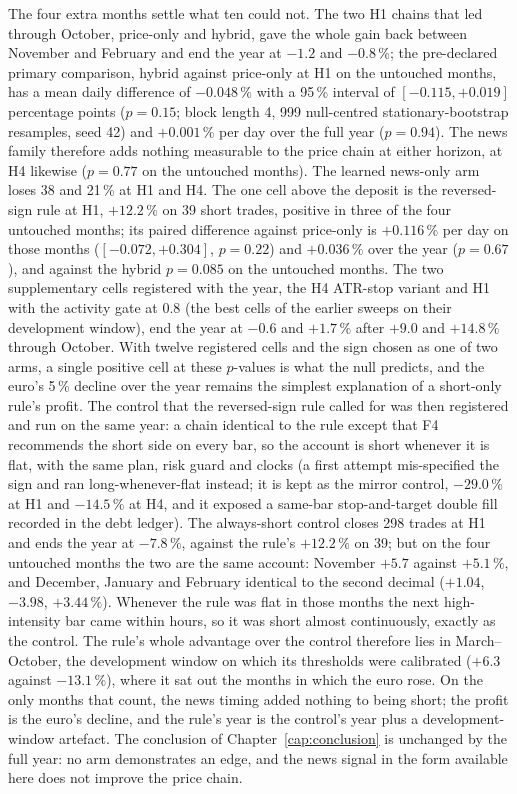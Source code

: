 The four extra months settle what ten could not. The two H1 chains that led through October, price-only and hybrid, gave the whole gain back between November and February and end the year at $-1.2$ and $-0.8\,\%$; the pre-declared primary comparison, hybrid against price-only at H1 on the untouched months, has a mean daily difference of $-0.048\,\%$ with a 95\,\% interval of $[-0.115, +0.019]$ percentage points ($p = 0.15$; block length 4, 999 null-centred stationary-bootstrap resamples, seed 42) and $+0.001\,\%$ per day over the full year ($p = 0.94$). The news family therefore adds nothing measurable to the price chain at either horizon, at H4 likewise ($p = 0.77$ on the untouched months). The learned news-only arm loses 38 and 21\,\% at H1 and H4. The one cell above the deposit is the reversed-sign rule at H1, $+12.2\,\%$ on 39 short trades, positive in three of the four untouched months; its paired difference against price-only is $+0.116\,\%$ per day on those months ($[-0.072, +0.304]$, $p = 0.22$) and $+0.036\,\%$ over the year ($p = 0.67$), and against the hybrid $p = 0.085$ on the untouched months. The two supplementary cells registered with the year, the H4 ATR-stop variant and H1 with the activity gate at 0.8 (the best cells of the earlier sweeps on their development window), end the year at $-0.6$ and $+1.7\,\%$ after $+9.0$ and $+14.8\,\%$ through October. With twelve registered cells and the sign chosen as one of two arms, a single positive cell at these $p$-values is what the null predicts, and the euro's 5\,\% decline over the year remains the simplest explanation of a short-only rule's profit. The control that the reversed-sign rule called for was then registered and run on the same year: a chain identical to the rule except that F4 recommends the short side on every bar, so the account is short whenever it is flat, with the same plan, risk guard and clocks (a first attempt mis-specified the sign and ran long-whenever-flat instead; it is kept as the mirror control, $-29.0\,\%$ at H1 and $-14.5\,\%$ at H4, and it exposed a same-bar stop-and-target double fill recorded in the debt ledger). The always-short control closes 298 trades at H1 and ends the year at $-7.8\,\%$, against the rule's $+12.2\,\%$ on 39; but on the four untouched months the two are the same account: November $+5.7$ against $+5.1\,\%$, and December, January and February identical to the second decimal ($+1.04$, $-3.98$, $+3.44\,\%$). Whenever the rule was flat in those months the next high-intensity bar came within hours, so it was short almost continuously, exactly as the control. The rule's whole advantage over the control therefore lies in March--October, the development window on which its thresholds were calibrated ($+6.3$ against $-13.1\,\%$), where it sat out the months in which the euro rose. On the only months that count, the news timing added nothing to being short; the profit is the euro's decline, and the rule's year is the control's year plus a development-window artefact. The conclusion of Chapter~\ref{cap:conclusion} is unchanged by the full year: no arm demonstrates an edge, and the news signal in the form available here does not improve the price chain.

